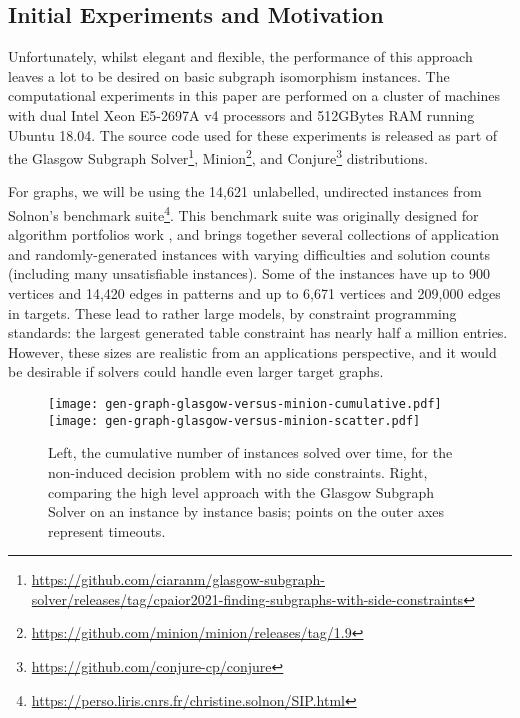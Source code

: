\documentclass[runningheads]{llncs}
\begin{document}
\subsection{Initial Experiments and Motivation}

Unfortunately, whilst elegant and flexible, the performance of this approach leaves a lot to be
desired on basic subgraph isomorphism instances.  The computational experiments in this paper are
performed on a cluster of machines with dual Intel Xeon E5-2697A v4 processors and 512GBytes RAM
running Ubuntu 18.04. The source code used for these experiments is released as part of the Glasgow
Subgraph
Solver\footnote{\url{https://github.com/ciaranm/glasgow-subgraph-solver/releases/tag/cpaior2021-finding-subgraphs-with-side-constraints}},
Minion\footnote{\url{https://github.com/minion/minion/releases/tag/1.9}}, and
Conjure\footnote{\url{https://github.com/conjure-cp/conjure}} distributions.

For graphs, we will be using the 14,621 unlabelled, undirected instances from
Solnon's benchmark suite\footnote{\url{https://perso.liris.cnrs.fr/christine.solnon/SIP.html}}. This
benchmark suite was originally designed for algorithm portfolios work
\cite{DBLP:conf/lion/KotthoffMS16}, and brings together several collections of application and
randomly-generated instances with varying difficulties and solution counts (including many
unsatisfiable instances). Some of the instances have up to 900 vertices and 14,420 edges in patterns
and up to 6,671 vertices and 209,000 edges in targets. These lead to rather large models, by
constraint programming standards: the largest generated table constraint has nearly half a million
entries. However, these sizes are realistic from an applications perspective, and it would be
desirable if solvers could handle even larger target graphs.

\begin{figure}[tb]
\texttt{[image: gen-graph-glasgow-versus-minion-cumulative.pdf]}\hfill\texttt{[image: gen-graph-glasgow-versus-minion-scatter.pdf]}

    \caption{Left, the cumulative number of instances solved over time, for the non-induced decision
    problem with no side constraints. Right, comparing the high level approach with the Glasgow
    Subgraph Solver on an instance by instance basis; points on the outer axes represent
    timeouts.}\label{figure:solvers}
\end{figure}
\end{document}
